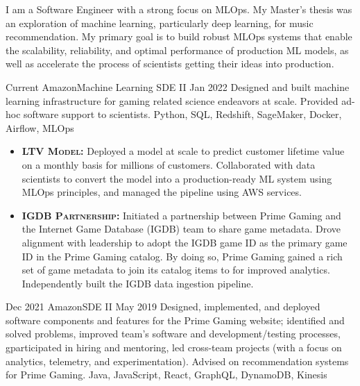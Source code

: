 \documentclass{cv}
\begin{document}
	\makecvheader

	\par{
		I am a Software Engineer with a strong focus on MLOps. My Master's thesis was an exploration of machine learning, particularly deep learning, for music recommendation. My primary goal is to build robust MLOps systems that enable the scalability, reliability, and optimal performance of production ML models, as well as accelerate the process of scientists getting their ideas into production. 
	}

	\bigskip
	
	\begin{experiences_env}
		\experienceWithProjects
			{Current}       {Amazon}{Machine Learning SDE II}
			{Jan 2022}      {
								Designed and built machine learning infrastructure for gaming related science endeavors at scale. Provided ad-hoc software support to scientists.
							}
							{Python, SQL, Redshift, SageMaker, Docker, Airflow, MLOps}
							{
								\begin{itemize}
									\item \textbf{\textsc{LTV Model:}} Deployed a model at scale to predict customer lifetime value on a monthly basis for millions of customers. Collaborated with data scientists to convert the model into a production-ready ML system using MLOps principles, and managed the pipeline using AWS services.
									\item \textbf{\textsc{IGDB Partnership:}} Initiated a partnership between Prime Gaming and the Internet Game Database (IGDB) team to share game metadata. Drove alignment with leadership to adopt the IGDB game ID as the primary game ID in the Prime Gaming catalog. By doing so, Prime Gaming gained a rich set of game metadata to join its catalog items to for improved analytics. Independently built the IGDB data ingestion pipeline.
								\end{itemize}
							}
		\emptySeparator
		\experienceWithProjects
			{Dec 2021}      {Amazon}{SDE II}
			{May 2019}      {
								Designed, implemented, and deployed software components and features for the Prime Gaming website; identified and solved problems, improved team’s software and development/testing processes, gparticipated in hiring and mentoring, led cross-team projects (with a focus on analytics, telemetry, and experimentation). Advised on recommendation systems for Prime Gaming.
							}
							{Java, JavaScript, React, GraphQL, DynamoDB, Kinesis}
							{
								\begin{itemize}

\end{itemize}}
\end{experiences_env}
\end{document}
